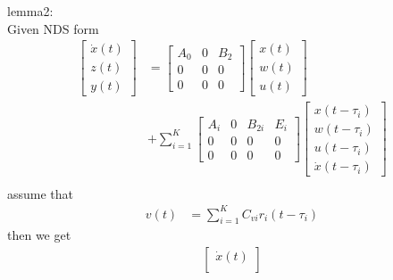 \documentclass[twocolumn]{autart}    %
\begin{document}
\begin{pf}
lemma2:\\
    Given NDS form
    \begin{equation}
        \begin{aligned}
            \begin{bmatrix}
                \dot{x}(t) \\
                z(t) \\
                y(t) 
            \end{bmatrix} & = \begin{bmatrix}
                A_{0} & 0 & B_{2}\\
                0 & 0 & 0\\
                0 & 0 & 0
            \end{bmatrix}\begin{bmatrix}
                x(t) \\
                w(t) \\
                u(t) 
            \end{bmatrix} \\ 
            &+ \sum_{i=1}^{K}\begin{bmatrix}
                A_{i} & 0 & B_{2i} & E_{i}\\
                0 & 0 & 0 & 0\\
                0 & 0 & 0 & 0
            \end{bmatrix} \begin{bmatrix}
                x(t-\tau_{i}) \\
                w(t-\tau_{i}) \\
                u(t-\tau_{i}) \\
                \dot{x}(t-\tau_{i})
            \end{bmatrix}\\
        \end{aligned}
    \end{equation}
    assume that
    \begin{equation}
        \begin{aligned}
            v(t) &= \sum_{i = 1}^{K}C_{vi}r_{i}(t-\tau_{i})
        \end{aligned}
    \end{equation}
    then we get
    \begin{equation}
        \begin{aligned}
            \begin{bmatrix}
                \dot{x}(t) \\

\end{bmatrix}
\end{aligned}
\end{equation}
\end{pf}
\end{document}
